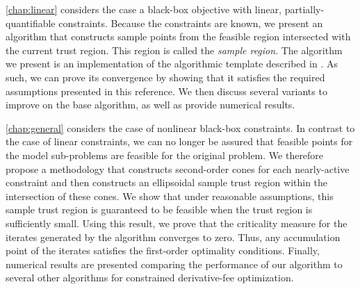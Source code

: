 % 
% 
% 

\cref{chap:linear} considers the case a black-box objective with linear,  partially-quantifiable constraints.
Because the constraints are known, we present an algorithm that constructs sample points from the feasible region intersected with the current trust region.
This region is called the {\em sample region}.
The algorithm we present is an implementation of the algorithmic template described in \cite{Conejo:2013:GCT:2620806.2621814}.
As such, we can prove its convergence by showing that it satisfies the required assumptions presented in this reference.
We then discuss several variants to improve on the base algorithm, as well as provide numerical results.

\cref{chap:general} considers the case of nonlinear black-box constraints.
In contrast to the case of linear constraints, we can no longer be assured that feasible points for the model sub-problems are feasible for the original problem.
We therefore propose a methodology that constructs second-order cones for each nearly-active constraint and then constructs an ellipsoidal sample trust region within the intersection of these cones.
We show that under reasonable assumptions, this sample trust region is guaranteed to be feasible when the trust region is sufficiently small.
Using this result,  we prove that the criticality measure for the iterates generated by the algorithm converges to zero.
Thus,  any accumulation point of the iterates satisfies the first-order optimality conditions.
Finally, numerical results are presented comparing the performance of our algorithm to several other algorithms for constrained derivative-fee optimization.


